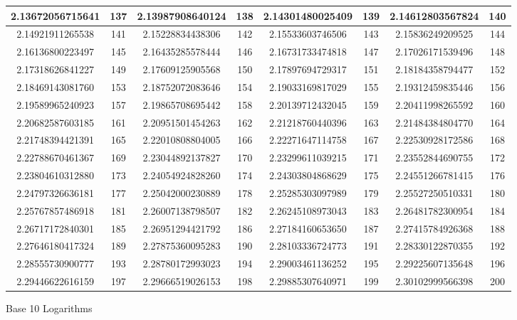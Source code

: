 \documentclass{exam}
\begin{document}
\begin{figure}
\begin{tabular}{|c|c||c|c||c|c||c|c|}
\hline
2.13672056715641 & 137 &2.13987908640124 & 138 &2.14301480025409 & 139 &2.14612803567824 & 140 \\
\hline
2.14921911265538 & 141 &2.15228834438306 & 142 &2.15533603746506 & 143 &2.15836249209525 & 144 \\
\hline
2.16136800223497 & 145 &2.16435285578444 & 146 &2.16731733474818 & 147 &2.17026171539496 & 148 \\
\hline
2.17318626841227 & 149 &2.17609125905568 & 150 &2.17897694729317 & 151 &2.18184358794477 & 152 \\
\hline
2.18469143081760 & 153 &2.18752072083646 & 154 &2.19033169817029 & 155 &2.19312459835446 & 156 \\
\hline
2.19589965240923 & 157 &2.19865708695442 & 158 &2.20139712432045 & 159 &2.20411998265592 & 160 \\
\hline
2.20682587603185 & 161 &2.20951501454263 & 162 &2.21218760440396 & 163 &2.21484384804770 & 164 \\
\hline
2.21748394421391 & 165 &2.22010808804005 & 166 &2.22271647114758 & 167 &2.22530928172586 & 168 \\
\hline
2.22788670461367 & 169 &2.23044892137827 & 170 &2.23299611039215 & 171 &2.23552844690755 & 172 \\
\hline
2.23804610312880 & 173 &2.24054924828260 & 174 &2.24303804868629 & 175 &2.24551266781415 & 176 \\
\hline
2.24797326636181 & 177 &2.25042000230889 & 178 &2.25285303097989 & 179 &2.25527250510331 & 180 \\
\hline
2.25767857486918 & 181 &2.26007138798507 & 182 &2.26245108973043 & 183 &2.26481782300954 & 184 \\
\hline
2.26717172840301 & 185 &2.26951294421792 & 186 &2.27184160653650 & 187 &2.27415784926368 & 188 \\
\hline
2.27646180417324 & 189 &2.27875360095283 & 190 &2.28103336724773 & 191 &2.28330122870355 & 192 \\
\hline
2.28555730900777 & 193 &2.28780172993023 & 194 &2.29003461136252 & 195 &2.29225607135648 & 196 \\
\hline
2.29446622616159 & 197 &2.29666519026153 & 198 &2.29885307640971 & 199 &2.30102999566398 & 200 \\
\hline


\hline
\end{tabular}

\caption{Base 10 Logarithms}
\end{figure}
\end{document}
